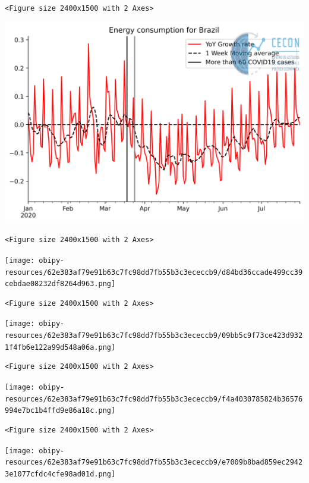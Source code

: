 \documentclass[11pt]{article}
\begin{document}
\begin{enumerate}
\begin{verbatim}
<Figure size 2400x1500 with 2 Axes>
\end{verbatim}


\begin{center}
\includegraphics[width=.9\linewidth]{obipy-resources/62e383af79e91b63c7fc98dd7fb55b3c3ececcb9/d4289bac917b4c3c16dd2a44f65ca09392f8c087.png}
\end{center}

\begin{verbatim}
<Figure size 2400x1500 with 2 Axes>
\end{verbatim}


\begin{center}
\texttt{[image: obipy-resources/62e383af79e91b63c7fc98dd7fb55b3c3ececcb9/d84bd36ccade499cc39cebdae08232df8264d963.png]}
\end{center}

\begin{verbatim}
<Figure size 2400x1500 with 2 Axes>
\end{verbatim}


\begin{center}
\texttt{[image: obipy-resources/62e383af79e91b63c7fc98dd7fb55b3c3ececcb9/09bb5c9f73ce423d9321f4fb6e122a99d548a06a.png]}
\end{center}

\begin{verbatim}
<Figure size 2400x1500 with 2 Axes>
\end{verbatim}


\begin{center}
\texttt{[image: obipy-resources/62e383af79e91b63c7fc98dd7fb55b3c3ececcb9/f4a4030785824b36576994e7bc1b4ffd9e86a18c.png]}
\end{center}

\begin{verbatim}
<Figure size 2400x1500 with 2 Axes>
\end{verbatim}


\begin{center}
\texttt{[image: obipy-resources/62e383af79e91b63c7fc98dd7fb55b3c3ececcb9/e7009b8bad859ec29423e1077cfdc4cfe98ad01d.png]}
\end{center}
\end{enumerate}
\end{document}
